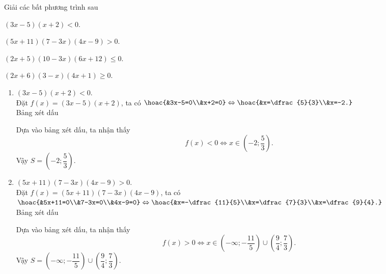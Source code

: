 \begin{bt}%
	Giải các bất phương trình sau
	\begin{listEX}[1]
		\item $(3x-5)(x+2)<0$.
		\item $(5x+11)(7-3x)(4x-9)>0$.
		\item $(2x+5)(10-3x)(6x+12)\le0$.
		\item $(2x+6)(3-x)(4x+1)\ge 0$.
	\end{listEX}
	\loigiai
	{
		\begin{enumerate}
			\item $(3x-5)(x+2)<0$.\\
			Đặt $f(x)=(3x-5)(x+2)$, ta có $\hoac{&3x-5=0\\&x+2=0}\Leftrightarrow\hoac{&x=\dfrac{5}{3}\\&x=-2.} $\\
			Bảng xét dấu 
			\begin{center}
			\end{center}
			
			Dựa vào bảng xét dấu, ta nhận thấy 
			$$f(x)<0 \Leftrightarrow x\in \left(-2;\dfrac{5}{3}\right). $$
			Vậy $S=\left(-2;\dfrac{5}{3}\right). $
			\item 
			$(5x+11)(7-3x)(4x-9)>0$.\\
			Đặt $f(x)=(5x+11)(7-3x)(4x-9)$, ta có $\hoac{&5x+11=0\\&7-3x=0\\&4x-9=0}\Leftrightarrow \hoac{&x=-\dfrac{11}{5}\\&x=\dfrac{7}{3}\\&x=\dfrac{9}{4}.}$\\
			Bảng xét dấu
			\begin{center}
			\end{center} 
			Dựa vào bảng xét dấu, ta nhận thấy
			$$f(x)>0 \Leftrightarrow x\in \left(-\infty;-\dfrac{11}{5}\right)\cup \left(\dfrac{9}{4};\dfrac{7}{3}\right). $$
			Vậy $S=\left(-\infty;-\dfrac{11}{5}\right)\cup \left(\dfrac{9}{4};\dfrac{7}{3}\right). $
			

\end{enumerate}}
\end{bt}

